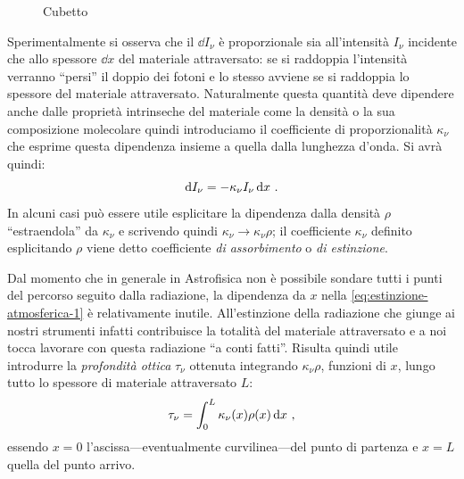         \begin{figure}
            \centering
            
            \caption{Cubetto}
        \end{figure}
        Sperimentalmente si osserva che il $\dd{I_\nu}$ è proporzionale sia all'intensità $I_\nu$ incidente che allo spessore $\dd{x}$ del materiale attraversato: se si raddoppia l'intensità verranno ``persi'' il doppio dei fotoni e lo stesso avviene se si raddoppia lo spessore del materiale attraversato. Naturalmente questa quantità deve dipendere anche dalle proprietà intrinseche del materiale come la densità o la sua composizione molecolare quindi introduciamo il coefficiente di proporzionalità $\kappa_\nu$ che esprime questa dipendenza insieme a quella dalla lunghezza d'onda. Si avrà quindi:
        \begin{equation}
            \label{eq:estinzione-atmosferica-1}
            \dd{I_\nu} = - \kappa_\nu I_\nu \dd{x}
            \,.
        \end{equation}
        In alcuni casi può essere utile esplicitare la dipendenza dalla densità $\rho$ ``estraendola'' da $\kappa_\nu$ e scrivendo quindi $\kappa_\nu \to \kappa_\nu\rho$; il coefficiente $\kappa_\nu$ definito esplicitando $\rho$ viene detto coefficiente \emph{di assorbimento} o \emph{di estinzione}.

        Dal momento che in generale in Astrofisica non è possibile sondare tutti i punti del percorso seguito dalla radiazione, la dipendenza da $x$ nella \eqref{eq:estinzione-atmosferica-1} è relativamente inutile. All'estinzione della radiazione che giunge ai nostri strumenti infatti contribuisce la totalità del materiale attraversato e a noi tocca lavorare con questa radiazione ``a conti fatti''. Risulta quindi utile introdurre la \emph{profondità ottica} $\tau_\nu$ ottenuta integrando $\kappa_\nu\rho$, funzioni di $x$, lungo tutto lo spessore di materiale attraversato $L$:
        \begin{equation}
            \label{eq:profondità-ottica}
            \tau_\nu = \int_{0}^{L} \kappa_\nu\pqty{x} \rho\pqty{x} \dd{x}
            \mycomma
        \end{equation}
        essendo $x=0$ l'ascissa---eventualmente curvilinea---del punto di partenza e $x=L$ quella del punto arrivo.

